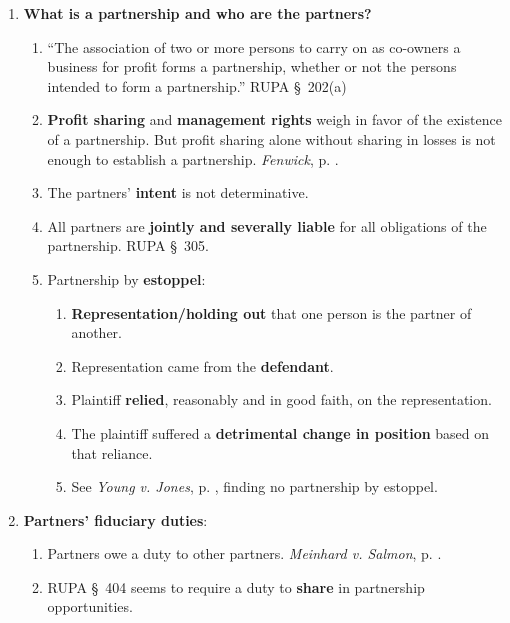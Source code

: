 \begin{enumerate}
    \item \textbf{What is a partnership and who are the partners?}
    \begin{enumerate}
        \item ``The association of two or more persons to carry on as 
        co-owners a business for profit forms a partnership, whether or not 
        the persons intended to form a partnership.'' RUPA \S\ 202(a)
        \item \textbf{Profit sharing} and \textbf{management rights} weigh in 
        favor of the existence of a partnership. But profit sharing alone 
        without sharing in losses is not enough to establish a partnership. 
        \emph{Fenwick}, p. \pageref{par:fenwick-ucc}.
        \item The partners' \textbf{intent} is not determinative.
        \item All partners are \textbf{jointly and severally liable} for all 
        obligations of the partnership. RUPA \S\ 305.
        \item Partnership by \textbf{estoppel}:
        \begin{enumerate}
            \item \textbf{Representation/holding out} that one person is the 
            partner of another.
            \item Representation came from the \textbf{defendant}.
            \item Plaintiff \textbf{relied}, reasonably and in good faith, on 
            the representation.
            \item The plaintiff suffered a \textbf{detrimental change in 
            position} based on that reliance.
            \item See \emph{Young v. Jones}, p. \pageref{par:young}, finding 
            no partnership by estoppel.
        \end{enumerate}
    \end{enumerate}
    \item \textbf{Partners' fiduciary duties}:
    \begin{enumerate}
        \item Partners owe a duty to other partners. \emph{Meinhard v. 
        Salmon}, p. \pageref{par:meinhard}.
        \item RUPA \S\ 404 seems to require a duty to \textbf{share} in 
        partnership opportunities.
    \end{enumerate}

\end{enumerate}

